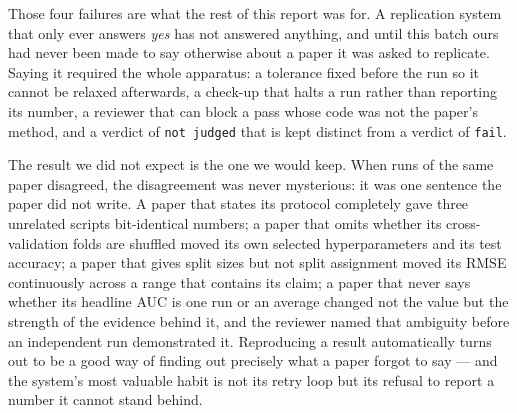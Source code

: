 \documentclass[11pt]{article}
\begin{document}
Those four failures are what the rest of this report was for. A replication system that only ever
answers \emph{yes} has not answered anything, and until this batch ours had never been made to
say otherwise about a paper it was asked to replicate. Saying it required the whole apparatus: a
tolerance fixed before the run so it cannot be relaxed afterwards, a check-up that halts a run
rather than reporting its number, a reviewer that can block a pass whose code was not the paper's
method, and a verdict of \texttt{not judged} that is kept distinct from a verdict of
\texttt{fail}.

The result we did not expect is the one we would keep. When runs of the same paper disagreed, the
disagreement was never mysterious: it was one sentence the paper did not write. A paper that
states its protocol completely gave three unrelated scripts bit-identical numbers; a paper that
omits whether its cross-validation folds are shuffled moved its own selected hyperparameters and
its test accuracy; a paper that gives split sizes but not split assignment moved its RMSE
continuously across a range that contains its claim; a paper that never says whether its headline
AUC is one run or an average changed not the value but the strength of the evidence behind it, and
the reviewer named that ambiguity before an independent run demonstrated it. Reproducing a result
automatically turns out to be a good way of finding out precisely what a paper forgot to say ---
and the system's most valuable habit is not its retry loop but its refusal to report a number it
cannot stand behind.
\end{document}
